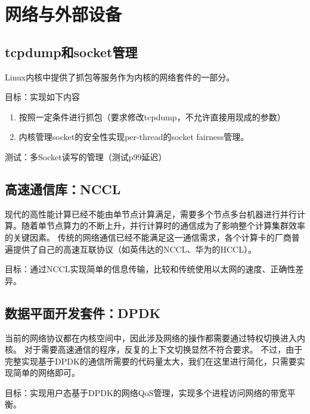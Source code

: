 \chapter{网络与外部设备}
\section{tcpdump和socket管理}
Linux内核中提供了抓包等服务作为内核的网络套件的一部分。

目标：实现如下内容
\begin{enumerate}
    \item 按照一定条件进行抓包（要求修改tcpdump，不允许直接用现成的参数）
    \item 内核管理socket的安全性实现per-thread的socket fairness管理。
\end{enumerate}

测试：多Socket读写的管理（测试p99延迟）

\section{高速通信库：NCCL}
现代的高性能计算已经不能由单节点计算满足，需要多个节点多台机器进行并行计算。随着单节点算力的不断上升，并行计算时的通信成为了影响整个计算集群效率的关键因素。
传统的网络通信已经不能满足这一通信需求，各个计算卡的厂商普遍提供了自己的高速互联协议（如英伟达的NCCL、华为的HCCL）。

目标：通过NCCL实现简单的信息传输，比较和传统使用以太网的速度、正确性差异。



\section{数据平面开发套件：DPDK}
当前的网络协议都在内核空间中，因此涉及网络的操作都需要通过特权切换进入内核。
对于需要高速通信的程序，反复的上下文切换显然不符合要求。
不过，由于完整实现基于DPDK的通信所需要的代码量太大，我们在这里进行简化，只需要实现简单的网络即可。

目标：实现用户态基于DPDK的网络QoS管理，实现多个进程访问网络的带宽平衡。